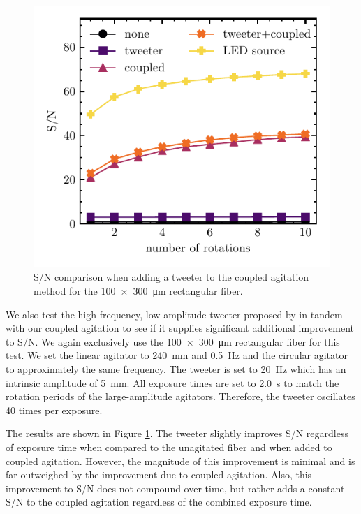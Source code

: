 \begin{figure}
\centering
	\includegraphics[width=\columnwidth]{figures-2/tweeter_snr.pdf}
	\caption[Signal-to-noise comparison with tweeter]{S/N comparison when adding a tweeter to the coupled agitation method for the \SI{100x300}{\micro\meter} rectangular fiber.}
\label{fig:tweeter_snr}
\end{figure}

We also test the high-frequency, low-amplitude tweeter proposed by \citet{plavchan_precision_2013} in tandem with our coupled agitation to see if it supplies significant additional improvement to S/N. We again exclusively use the \SI{100x300}{\micro\meter} rectangular fiber for this test. We set the linear agitator to \SI{240}{\milli\meter} and \SI{0.5}{\hertz} and the circular agitator to approximately the same frequency. The tweeter is set to \SI{20}{\hertz} which has an intrinsic amplitude of \SI{5}{\milli\meter}. All exposure times are set to \SI{2.0}{\second} to match the rotation periods of the large-amplitude agitators. Therefore, the tweeter oscillates 40 times per exposure.

The results are shown in Figure \ref{fig:tweeter_snr}. The tweeter slightly improves S/N regardless of exposure time when compared to the unagitated fiber and when added to coupled agitation. However, the magnitude of this improvement is minimal and is far outweighed by the improvement due to coupled agitation. Also, this improvement to S/N does not compound over time, but rather adds a constant S/N to the coupled agitation regardless of the combined exposure time.

